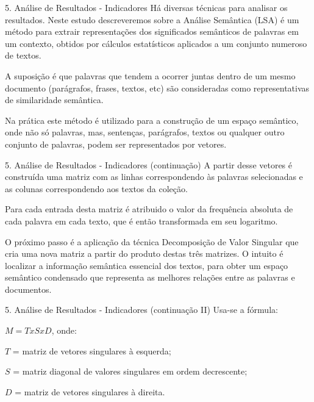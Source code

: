 \documentclass[
  ignorenonframetext,
]{beamer}
\begin{document}
\begin{frame}{5. Análise de Resultados - Indicadores}
\protect\hypertarget{anuxe1lise-de-resultados---indicadores}{}
Há diversas técnicas para analisar os resultados. Neste estudo
descreveremos sobre a Análise Semântica (LSA) é um método para extrair
representações dos significados semânticos de palavras em um contexto,
obtidos por cálculos estatísticos aplicados a um conjunto numeroso de
textos.

A suposição é que palavras que tendem a ocorrer juntas dentro de um
mesmo documento (parágrafos, frases, textos, etc) são consideradas como
representativas de similaridade semântica.

Na prática este método é utilizado para a construção de um espaço
semântico, onde não só palavras, mas, sentenças, parágrafos, textos ou
qualquer outro conjunto de palavras, podem ser representados por
vetores.
\end{frame}

\begin{frame}{5. Análise de Resultados - Indicadores (continuação)}
\protect\hypertarget{anuxe1lise-de-resultados---indicadores-continuauxe7uxe3o}{}
A partir desse vetores é construída uma matriz com as linhas
correspondendo às palavras selecionadas e as colunas correspondendo aos
textos da coleção.

Para cada entrada desta matriz é atribuido o valor da frequência
absoluta de cada palavra em cada texto, que é então transformada em seu
logaritmo.

O próximo passo é a aplicação da técnica Decomposição de Valor Singular
que cria uma nova matriz a partir do produto destas três matrizes. O
intuito é localizar a informação semântica essencial dos textos, para
obter um espaço semântico condensado que representa as melhores relações
entre as palavras e documentos.
\end{frame}

\begin{frame}{5. Análise de Resultados - Indicadores (continuação II)}
\protect\hypertarget{anuxe1lise-de-resultados---indicadores-continuauxe7uxe3o-ii}{}
Usa-se a fórmula:

\(M = T x S x D\), onde:

\(T\) = matriz de vetores singulares à esquerda;

\(S\) = matriz diagonal de valores singulares em ordem decrescente;

\(D\) = matriz de vetores singulares à direita.
\end{frame}
\end{document}

